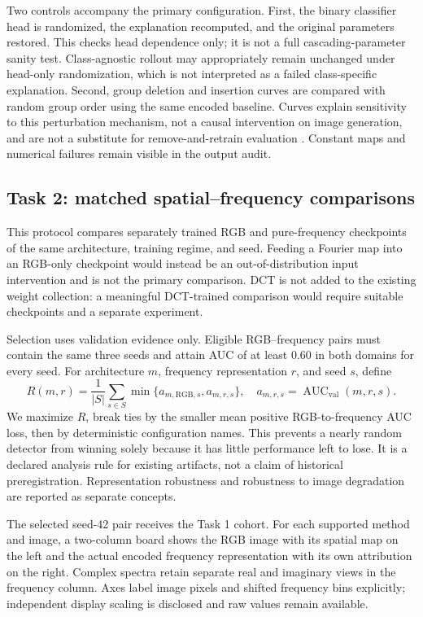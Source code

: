 \documentclass{article}
\newcommand{\AUC}{\operatorname{AUC}}
\begin{document}
Two controls accompany the primary configuration. First, the binary classifier head is randomized, the explanation recomputed, and the original parameters restored. This checks head dependence only; it is not a full cascading-parameter sanity test. Class-agnostic rollout may appropriately remain unchanged under head-only randomization, which is not interpreted as a failed class-specific explanation. Second, group deletion and insertion curves are compared with random group order using the same encoded baseline. Curves explain sensitivity to this perturbation mechanism, not a causal intervention on image generation, and are not a substitute for remove-and-retrain evaluation \citep{hooker2019}. Constant maps and numerical failures remain visible in the output audit.

\subsection{Task 2: matched spatial--frequency comparisons}
This protocol compares separately trained RGB and pure-frequency checkpoints of the same architecture, training regime, and seed. Feeding a Fourier map into an RGB-only checkpoint would instead be an out-of-distribution input intervention and is not the primary comparison. DCT is not added to the existing weight collection: a meaningful DCT-trained comparison would require suitable checkpoints and a separate experiment.

Selection uses validation evidence only. Eligible RGB--frequency pairs must contain the same three seeds and attain AUC of at least 0.60 in both domains for every seed. For architecture $m$, frequency representation $r$, and seed $s$, define
\begin{equation}
 R(m,r)=\frac{1}{|S|}\sum_{s\in S}\min\{a_{m,\mathrm{RGB},s},a_{m,r,s}\},
 \quad a_{m,r,s}=\AUC_{\mathrm{val}}(m,r,s).
\end{equation}
We maximize $R$, break ties by the smaller mean positive RGB-to-frequency AUC loss, then by deterministic configuration names. This prevents a nearly random detector from winning solely because it has little performance left to lose. It is a declared analysis rule for existing artifacts, not a claim of historical preregistration. Representation robustness and robustness to image degradation are reported as separate concepts.

The selected seed-42 pair receives the Task 1 cohort. For each supported method and image, a two-column board shows the RGB image with its spatial map on the left and the actual encoded frequency representation with its own attribution on the right. Complex spectra retain separate real and imaginary views in the frequency column. Axes label image pixels and shifted frequency bins explicitly; independent display scaling is disclosed and raw values remain available.
\end{document}
